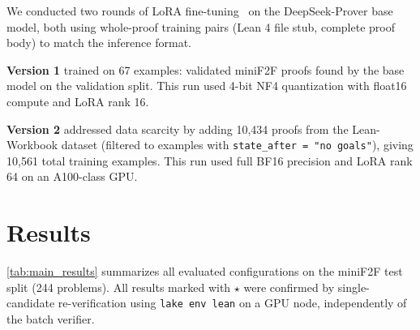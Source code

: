 \documentclass[openany, amssymb, psamsfonts]{amsart}
\theoremstyle{definition}
\numberwithin{equation}{section}
\begin{document}
We conducted two rounds of LoRA fine-tuning~\cite{lora} on the DeepSeek-Prover base model,
both using whole-proof training pairs (Lean 4 file stub, complete proof body)
to match the inference format.

\textbf{Version 1} trained on 67 examples: validated miniF2F proofs found
by the base model on the validation split.
This run used 4-bit NF4 quantization with float16 compute and LoRA rank 16.

\textbf{Version 2} addressed data scarcity by adding 10,434 proofs from the
Lean-Workbook dataset \cite{leanworkbook} (filtered to examples with
\texttt{state\_after = "no goals"}), giving 10,561 total training examples.
This run used full BF16 precision and LoRA rank 64 on an A100-class GPU.

\section{Results}

\autoref{tab:main_results} summarizes all evaluated configurations on the
miniF2F test split (244 problems).
All results marked with $\star$ were confirmed by single-candidate re-verification
using \texttt{lake env lean} on a GPU node, independently of the batch verifier.

\begin{table}[h]
\centering
\caption{miniF2F-test results (244 problems). $\star$ = independently re-verified
via \texttt{lake env lean} on a GPU node.}
\label{tab:main_results}
\end{table}
\end{document}
